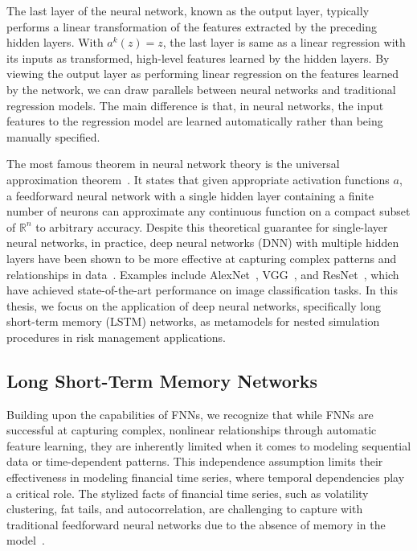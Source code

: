 The last layer of the neural network, known as the output layer, typically performs a linear transformation of the features extracted by the preceding hidden layers. 
With $a^{k}(z) = z$, the last layer is same as a linear regression with its inputs as transformed, high-level features learned by the hidden layers.
By viewing the output layer as performing linear regression on the features learned by the network, we can draw parallels between neural networks and traditional regression models. 
The main difference is that, in neural networks, the input features to the regression model are learned automatically rather than being manually specified.

The most famous theorem in neural network theory is the universal approximation theorem~\citep{hornik1989multilayer}.
It states that given appropriate activation functions $a$, a feedforward neural network with a single hidden layer containing a finite number of neurons can approximate any continuous function on a compact subset of $\mathbb{R}^n$ to arbitrary accuracy. 
Despite this theoretical guarantee for single-layer neural networks, in practice, deep neural networks (DNN) with multiple hidden layers have been shown to be more effective at capturing complex patterns and relationships in data~\citep{lecun2015deep}.
Examples include AlexNet~\citep{krizhevsky2012imagenet}, VGG~\citep{simonyan2014very}, and ResNet~\citep{he2016deep}, which have achieved state-of-the-art performance on image classification tasks.
In this thesis, we focus on the application of deep neural networks, specifically long short-term memory (LSTM) networks, as metamodels for nested simulation procedures in risk management applications.

\subsection{Long Short-Term Memory Networks}

Building upon the capabilities of FNNs, we recognize that while FNNs are successful at capturing complex, nonlinear relationships through automatic feature learning, they are inherently limited when it comes to modeling sequential data or time-dependent patterns. 
This independence assumption limits their effectiveness in modeling financial time series, where temporal dependencies play a critical role. 
The stylized facts of financial time series, such as volatility clustering, fat tails, and autocorrelation, are challenging to capture with traditional feedforward neural networks due to the absence of memory in the model~\citep{cont2001empirical}.

